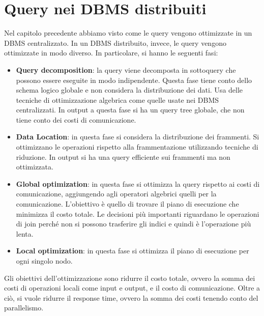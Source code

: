 \section{Query nei DBMS distribuiti}
Nel capitolo precedente abbiamo visto come le query vengono ottimizzate in un
DBMS centralizzato. In un DBMS distribuito, invece, le query vengono ottimizzate
in modo diverso. In particolare, si hanno le seguenti fasi:
\begin{itemize}
    \item \textbf{Query decomposition}: la query viene decomposta in
          sottoquery che possono essere eseguite in modo indipendente. Questa
          fase tiene conto dello schema logico globale e non considera la
          distribuzione dei dati. Usa delle tecniche di ottimizzazione algebrica
          come quelle usate nei DBMS centralizzati.
          In output a questa fase si ha un query tree globale, che non tiene
          conto dei costi di comunicazione.
    \item \textbf{Data Location}: in questa fase si considera la distribuzione
          dei frammenti. Si ottimizzano le operazioni rispetto alla
          frammentazione utilizzando tecniche di riduzione. In output si ha una
          query efficiente sui frammenti ma non ottimizzata.
    \item \textbf{Global optimization}: in questa fase si ottimizza la query
          rispetto ai costi di comunicazione, aggiungendo agli operatori
          algebrici quelli per la comunicazione. L'obiettivo è quello di
          trovare il piano di esecuzione che minimizza il costo totale. Le
          decisioni più importanti riguardano le operazioni di join perché
          non si possono trasferire gli indici e quindi è l'operazione più lenta.
    \item \textbf{Local optimization}: in questa fase si ottimizza il piano di
          esecuzione per ogni singolo nodo.
\end{itemize}
Gli obiettivi dell'ottimizzazione sono ridurre il costo totale, ovvero la somma
dei costi di operazioni locali come input e output, e il costo di comunicazione.
Oltre a ciò, si vuole ridurre il response time, ovvero la somma dei costi tenendo
conto del parallelismo.

